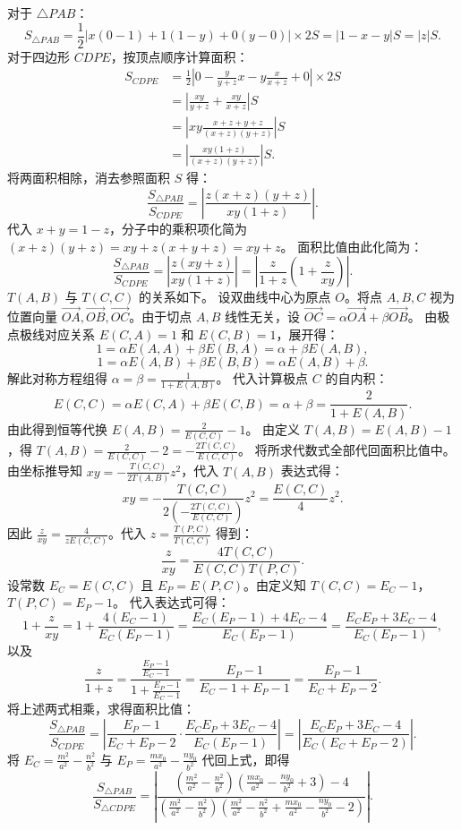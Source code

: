 \begin{solution}
对于 $\triangle PAB$：
\[ S_{\triangle PAB} = \frac{1}{2} \big| x(0-1) + 1(1-y) + 0(y-0) \big| \times 2S = |1 - x - y| S = |z| S. \]
对于四边形 $CDPE$，按顶点顺序计算面积：
\[
\begin{aligned}
S_{CDPE}
&= \frac{1}{2} \left| 0 - \frac{y}{y+z}x - y\frac{x}{x+z} + 0 \right| \times 2S \\
&= \left| \frac{xy}{y+z} + \frac{xy}{x+z} \right| S \\
&= \left| xy \frac{x+z+y+z}{(x+z)(y+z)} \right| S \\
&= \left| \frac{xy(1+z)}{(x+z)(y+z)} \right| S.
\end{aligned}
\]
将两面积相除，消去参照面积 $S$ 得：
\[ \frac{S_{\triangle PAB}}{S_{CDPE}} = \left| \frac{z(x+z)(y+z)}{xy(1+z)} \right|. \]
代入 $x+y = 1-z$，分子中的乘积项化简为 $(x+z)(y+z) = xy + z(x+y+z) = xy + z$。
面积比值由此化简为：
\[ \frac{S_{\triangle PAB}}{S_{CDPE}} = \left| \frac{z(xy+z)}{xy(1+z)} \right| = \left| \frac{z}{1+z} \left( 1 + \frac{z}{xy} \right) \right|. \]
$T(A,B)$ 与 $T(C,C)$ 的关系如下。
设双曲线中心为原点 $O$。将点 $A, B, C$ 视为位置向量 $\overrightarrow{OA}, \overrightarrow{OB}, \overrightarrow{OC}$。由于切点 $A, B$ 线性无关，设 $\overrightarrow{OC} = \alpha \overrightarrow{OA} + \beta \overrightarrow{OB}$。
由极点极线对应关系 $E(C,A) = 1$ 和 $E(C,B) = 1$，展开得：
\[ 1 = \alpha E(A,A) + \beta E(B,A) = \alpha + \beta E(A,B), \]
\[ 1 = \alpha E(A,B) + \beta E(B,B) = \alpha E(A,B) + \beta. \]
解此对称方程组得 $\alpha = \beta = \frac{1}{1 + E(A,B)}$。
代入计算极点 $C$ 的自内积：
\[ E(C,C) = \alpha E(C,A) + \beta E(C,B) = \alpha + \beta = \frac{2}{1 + E(A,B)}. \]
由此得到恒等代换 $E(A,B) = \frac{2}{E(C,C)} - 1$。
由定义 $T(A,B) = E(A,B) - 1$，得 $T(A,B) = \frac{2}{E(C,C)} - 2 = - \frac{2 T(C,C)}{E(C,C)}$。
将所求代数式全部代回面积比值中。
由坐标推导知 $xy = - \frac{T(C,C)}{2 T(A,B)} z^2$，代入 $T(A,B)$ 表达式得：
\[ xy = - \frac{T(C,C)}{2 \left( - \frac{2 T(C,C)}{E(C,C)} \right)} z^2 = \frac{E(C,C)}{4} z^2. \]
因此 $\frac{z}{xy} = \frac{4}{z E(C,C)}$。代入 $z = \frac{T(P,C)}{T(C,C)}$ 得到：
\[ \frac{z}{xy} = \frac{4 T(C,C)}{E(C,C) T(P,C)}. \]
设常数 $E_C = E(C,C)$ 且 $E_P = E(P,C)$。由定义知 $T(C,C) = E_C - 1$，$T(P,C) = E_P - 1$。
代入表达式可得：
\[ 1 + \frac{z}{xy} = 1 + \frac{4(E_C - 1)}{E_C(E_P - 1)} = \frac{E_C(E_P - 1) + 4E_C - 4}{E_C(E_P - 1)} = \frac{E_C E_P + 3E_C - 4}{E_C(E_P - 1)}, \]
以及
\[ \frac{z}{1+z} = \frac{\frac{E_P - 1}{E_C - 1}}{1 + \frac{E_P - 1}{E_C - 1}} = \frac{E_P - 1}{E_C - 1 + E_P - 1} = \frac{E_P - 1}{E_C + E_P - 2}. \]
将上述两式相乘，求得面积比值：
\[ \frac{S_{\triangle PAB}}{S_{CDPE}} = \left| \frac{E_P - 1}{E_C + E_P - 2} \cdot \frac{E_C E_P + 3E_C - 4}{E_C(E_P - 1)} \right| = \left| \frac{E_C E_P + 3E_C - 4}{E_C(E_C + E_P - 2)} \right|. \]
将 $E_C = \frac{m^2}{a^2} - \frac{n^2}{b^2}$ 与 $E_P = \frac{mx_0}{a^2} - \frac{ny_0}{b^2}$ 代回上式，即得
\[ \frac{S_{\triangle PAB}}{S_{\triangle CDPE}} = \left| \frac{ \left( \frac{m^2}{a^2} - \frac{n^2}{b^2} \right)\left( \frac{mx_0}{a^2} - \frac{ny_0}{b^2} + 3 \right) - 4 }{ \left( \frac{m^2}{a^2} - \frac{n^2}{b^2} \right)\left( \frac{m^2}{a^2} - \frac{n^2}{b^2} + \frac{mx_0}{a^2} - \frac{ny_0}{b^2} - 2 \right) } \right|. \]

\end{solution}
